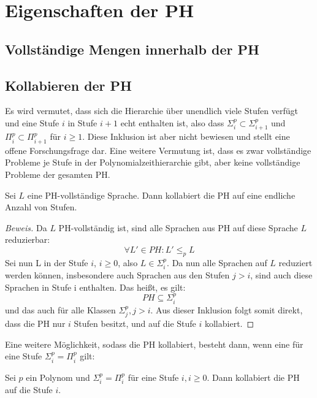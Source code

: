 \chapter{Eigenschaften der PH} \label{chapter: Eigenschaften der PH}
\section{Vollständige Mengen innerhalb der PH} \label{section: Vollständige Mengen innerhalb der PH}

\section{Kollabieren der PH} \label{section: Kollabieren der PH}
Es wird vermutet, dass sich die Hierarchie über unendlich viele Stufen verfügt und eine Stufe $i$ in Stufe $i + 1$ echt enthalten ist,
also dass $\Sigma^p_i \subset \Sigma^p_{i+1}$ und $\Pi^p_i \subset \Pi^p_{i+1}$ für $i \geq 1$. Diese Inklusion ist aber nicht bewiesen und stellt eine offene
Forschungsfrage dar. Eine weitere Vermutung ist, dass es zwar vollständige Probleme je Stufe in der Polynomialzeithierarchie gibt, aber keine vollständige Probleme der gesamten PH.
\begin{theorem}
    Sei $L$ eine PH-vollständige Sprache. Dann kollabiert die PH auf eine endliche Anzahl von Stufen. 
\end{theorem}

\begin{proof}[Beweis]
    Da $L$ PH-vollständig ist, sind alle Sprachen aus PH auf diese Sprache $L$ reduzierbar:
    $$
    \forall L' \in PH: L' \leq_p L
    $$
    Sei nun L in der Stufe $i$, $i \geq 0$, also $L \in \Sigma^p_i$. Da nun alle Sprachen auf $L$ reduziert werden können, insbesondere
    auch Sprachen aus den Stufen $j > i$, sind auch diese Sprachen in Stufe i enthalten.
    Das heißt, es gilt: 
    $$
    PH \subseteq \Sigma^p_i
    $$ 
    und das auch für alle Klassen $\Sigma^p_j, j> i$.
    Aus dieser Inklusion folgt somit direkt, dass die PH nur $i$ Stufen besitzt, und auf die Stufe $i$ kollabiert.
\end{proof}

Eine weitere Möglichkeit, sodass die PH kollabiert, besteht dann, wenn eine für eine Stufe $\Sigma^p_i = \Pi^p_i$ gilt:

\begin{theorem}
    Sei $p$ ein Polynom und $\Sigma^p_i = \Pi^p_i$ für eine Stufe $i, i \geq 0$. Dann kollabiert die PH auf die Stufe $i$.
\end{theorem}

